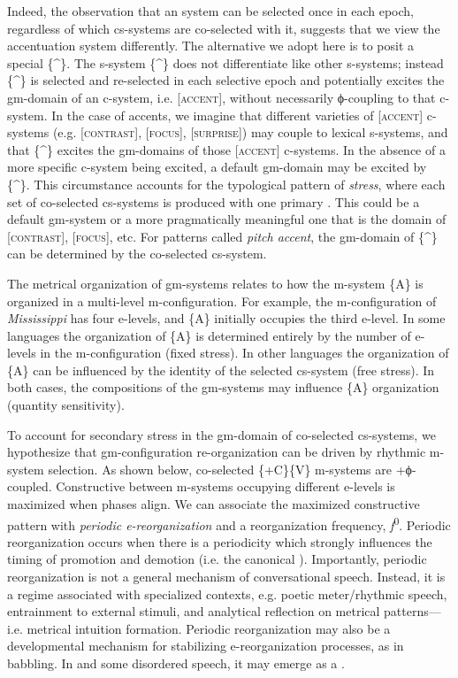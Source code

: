   Indeed, the observation that an  system can be selected once in each epoch, regardless of which cs-systems are co-selected with it, suggests that we view the accentuation system differently. The alternative we adopt here is to posit a special  \{\^{}\}. The s-system \{\^{}\} does not differentiate like other s-systems; instead \{\^{}\} is selected and re-selected in each selective epoch and potentially excites the gm-domain of an  c-system, i.e. [\textsc{accent}], without necessarily ϕ-coupling to that c-system. In the case of  accents, we imagine that different varieties of [\textsc{accent}] c-systems (e.g. [\textsc{contrast}], [\textsc{focus}], [\textsc{surprise}]) may couple to lexical s-systems, and that \{\^{}\} excites the gm-domains of those [\textsc{accent}] c-systems. In the absence of a more specific c-system being excited, a default gm-domain may be excited by \{\^{}\}. This circumstance accounts for the typological pattern of \textit{stress}, where each set of co-selected cs-systems is produced with one primary . This could be a default gm-system or a more pragmatically meaningful one that is the domain of [\textsc{contrast}], [\textsc{focus}], etc. For patterns called \textit{pitch accent}, the gm-domain of \{\^{}\} can be determined by the co-selected cs-system.

  The metrical organization of  gm-systems relates to how the m-system \{A\} is organized in a multi-level m-configuration. For example, the m-configuration of \textit{Mississippi} has four e-levels, and \{A\} initially occupies the third e-level. In some languages the organization of \{A\} is determined entirely by the number of e-levels in the m-configuration (fixed stress). In other languages the organization of \{A\} can be influenced by the identity of the selected cs-system (free stress). In both cases, the compositions of the gm-systems may influence \{A\} organization (quantity sensitivity). 

  To account for secondary stress in the gm-domain of co-selected cs-systems, we hypothesize that gm-configuration re-organization can be driven by rhythmic m-system selection. As shown below, co-selected \{+C\}\{V\} m-systems are +ϕ-coupled. Constructive  between m-systems occupying different e-levels is maximized when  phases align. We can associate the maximized constructive  pattern with \textit{periodic e-reorganization} and a reorganization frequency, \textit{f}\textsuperscript{0}. Periodic reorganization occurs when there is a periodicity which strongly influences the timing of promotion and demotion (i.e. the canonical ). Importantly, periodic reorganization is not a general mechanism of conversational speech. Instead, it is a regime associated with specialized contexts, e.g. poetic meter/rhythmic speech, entrainment to external stimuli, and analytical reflection on metrical patterns—i.e. metrical intuition formation. Periodic reorganization may also be a developmental mechanism for stabilizing e-reorganization processes, as in babbling. In  and some disordered speech, it may emerge as a .

